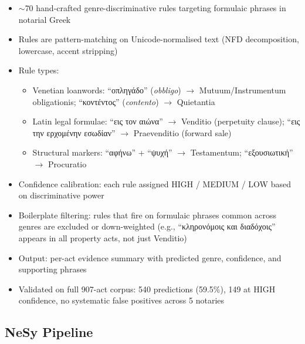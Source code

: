 \documentclass[10pt, a4paper]{article}
\begin{document}
\begin{itemize}
\item $\sim$70 hand-crafted genre-discriminative rules targeting formulaic phrases in notarial Greek
\item Rules are pattern-matching on Unicode-normalised text (NFD decomposition, lowercase, accent stripping)
\item Rule types:
  \begin{itemize}
  \item Venetian loanwords: ``οπληγάδο'' (\emph{obbligo}) $\rightarrow$ Mutuum/Instrumentum obligationis; ``κοντέντος'' (\emph{contento}) $\rightarrow$ Quietantia
  \item Latin legal formulae: ``εις τον αιώνα'' $\rightarrow$ Venditio (perpetuity clause); ``εις την ερχομένην εσωδίαν'' $\rightarrow$ Praevenditio (forward sale)
  \item Structural markers: ``αφήνω'' + ``ψυχή'' $\rightarrow$ Testamentum; ``εξουσιωτική'' $\rightarrow$ Procuratio
  \end{itemize}
\item Confidence calibration: each rule assigned HIGH / MEDIUM / LOW based on discriminative power
\item Boilerplate filtering: rules that fire on formulaic phrases common across genres are excluded or down-weighted (e.g., ``κληρονόμοις και διαδόχοις'' appears in all property acts, not just Venditio)
\item Output: per-act evidence summary with predicted genre, confidence, and supporting phrases
\item Validated on full 907-act corpus: 540 predictions (59.5\%), 149 at HIGH confidence, no systematic false positives across 5 notaries
\end{itemize}

\subsection{NeSy Pipeline}
\end{document}
